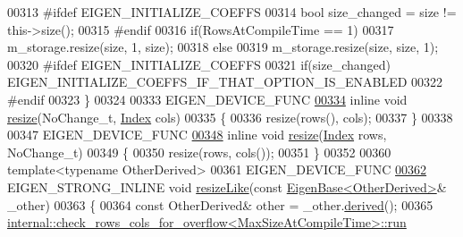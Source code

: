 \begin{DoxyCode}
00313 \textcolor{preprocessor}{      #ifdef EIGEN\_INITIALIZE\_COEFFS}
00314         \textcolor{keywordtype}{bool} size\_changed = size != this->size();
00315 \textcolor{preprocessor}{      #endif}
00316       \textcolor{keywordflow}{if}(RowsAtCompileTime == 1)
00317         m\_storage.resize(size, 1, size);
00318       \textcolor{keywordflow}{else}
00319         m\_storage.resize(size, size, 1);
00320 \textcolor{preprocessor}{      #ifdef EIGEN\_INITIALIZE\_COEFFS}
00321         \textcolor{keywordflow}{if}(size\_changed) EIGEN\_INITIALIZE\_COEFFS\_IF\_THAT\_OPTION\_IS\_ENABLED
00322 \textcolor{preprocessor}{      #endif}
00323     \}
00324 
00333     EIGEN\_DEVICE\_FUNC
\hyperlink{class_eigen_1_1_plain_object_base_ab71a655f73d05a0e389e3ed13b6fe5f3}{00334}     \textcolor{keyword}{inline} \textcolor{keywordtype}{void} \hyperlink{class_eigen_1_1_plain_object_base_ab71a655f73d05a0e389e3ed13b6fe5f3}{resize}(NoChange\_t, \hyperlink{namespace_eigen_a62e77e0933482dafde8fe197d9a2cfde}{Index} cols)
00335     \{
00336       resize(rows(), cols);
00337     \}
00338 
00347     EIGEN\_DEVICE\_FUNC
\hyperlink{class_eigen_1_1_plain_object_base_a7b44761b7350ae3756035bbf7d7c04f6}{00348}     \textcolor{keyword}{inline} \textcolor{keywordtype}{void} \hyperlink{class_eigen_1_1_plain_object_base_a7b44761b7350ae3756035bbf7d7c04f6}{resize}(\hyperlink{namespace_eigen_a62e77e0933482dafde8fe197d9a2cfde}{Index} rows, NoChange\_t)
00349     \{
00350       resize(rows, cols());
00351     \}
00352 
00360     \textcolor{keyword}{template}<\textcolor{keyword}{typename} OtherDerived>
00361     EIGEN\_DEVICE\_FUNC 
\hyperlink{class_eigen_1_1_plain_object_base_acc7200947e6399bee847ff37c8270fc8}{00362}     EIGEN\_STRONG\_INLINE \textcolor{keywordtype}{void} \hyperlink{class_eigen_1_1_plain_object_base_acc7200947e6399bee847ff37c8270fc8}{resizeLike}(\textcolor{keyword}{const} \hyperlink{group___core___module_struct_eigen_1_1_eigen_base}{EigenBase<OtherDerived>}& 
      \_other)
00363     \{
00364       \textcolor{keyword}{const} OtherDerived& other = \_other.\hyperlink{group___core___module_a324b16961a11d2ecfd2d1b7dd7946545}{derived}();
00365       \hyperlink{struct_eigen_1_1internal_1_1check__rows__cols__for__overflow}{internal::check\_rows\_cols\_for\_overflow<MaxSizeAtCompileTime>::run}

\end{DoxyCode}
